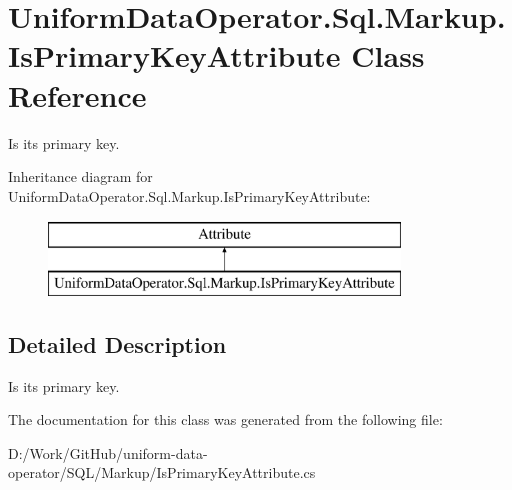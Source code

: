 \hypertarget{class_uniform_data_operator_1_1_sql_1_1_markup_1_1_is_primary_key_attribute}{}\section{Uniform\+Data\+Operator.\+Sql.\+Markup.\+Is\+Primary\+Key\+Attribute Class Reference}
\label{class_uniform_data_operator_1_1_sql_1_1_markup_1_1_is_primary_key_attribute}


Is it\textquotesingle{}s primary key.  


Inheritance diagram for Uniform\+Data\+Operator.\+Sql.\+Markup.\+Is\+Primary\+Key\+Attribute\+:\begin{figure}[H]
\begin{center}
\leavevmode
\includegraphics[height=2.000000cm]{d2/d28/class_uniform_data_operator_1_1_sql_1_1_markup_1_1_is_primary_key_attribute}
\end{center}
\end{figure}


\subsection{Detailed Description}
Is it\textquotesingle{}s primary key. 



The documentation for this class was generated from the following file\+:\begin{DoxyCompactItemize}
\item 
D\+:/\+Work/\+Git\+Hub/uniform-\/data-\/operator/\+S\+Q\+L/\+Markup/Is\+Primary\+Key\+Attribute.\+cs\end{DoxyCompactItemize}
